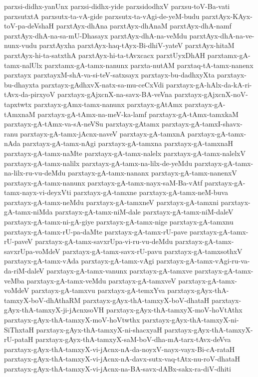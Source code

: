 {parxsi-didhx-yanUnx
parxsi-didhx-yide
parxsidodhxV
parxsu-toV-Ba-vati
parxsutxtA
parxsutx-ta-vA-gide
parxsutx-ta-vAgi-de-yeM-budu
parxtAyx-KAyx-toV-pa-deVshaH
parxtAyx-dhAna
parxtAyx-dhAnaM
parxtAyx-dhA-namf
parxtAyx-dhA-na-sa-mU-Dhasayx
parxtAyx-dhA-na-veMdu
parxtAyx-dhA-na-ve-nunx-vudu
parxtAyxha
parxtAyx-haq-tAyx-Bi-dhiV-yateV
parxtAyx-hitaM
parxtAyx-hi-ta-satxthA
parxtAyx-hi-ta-tAvxcacx
parxtUyxDhAH
parxtamx-gA-tamx-nalUlx
parxtamx-gA-tamx-nanunx
parxta-nutAM
parxtaq-tA-tamx-nanenx
parxtayx
parxtayxM-shA-va-si-teV-satxsayx
parxtayx-bu-dadhxyXta
parxtayx-bu-dhayxta
parxtayx-gAdhxvX-natx-sa-mu-ceCxVdi
parxtayx-gA-hAlx-da-kA-ri-tAvx-da-pirxyoV
parxtayx-gAjxcnX-na-savx-BA-veVna
parxtayx-gAjxcnX-noV-tapxtwtx
parxtayx-gAmx-tamx-nanunx
parxtayx-gAtAmx
parxtayx-gA-tAmxnaM
parxtayx-gA-tAmx-na-meV-ka-lamf
parxtayx-gA-tAmx-tamxkaM
parxtayx-gA-tAmx-va-sA-neVSu
parxtayx-gAtamx
parxtayx-gA-tamxI-shavx-ranu
parxtayx-gA-tamx-jAcnx-naveV
parxtayx-gA-tamxnA
parxtayx-gA-tamx-nAda
parxtayx-gA-tamx-nAgi
parxtayx-gA-tamxna
parxtayx-gA-tamxnaH
parxtayx-gA-tamx-naMte
parxtayx-gA-tamx-nalelx
parxtayx-gA-tamx-nalelxV
parxtayx-gA-tamx-nalilx
parxtayx-gA-tamx-na-lilx-de-yeMdu
parxtayx-gA-tamx-na-lilx-ru-vu-deMdu
parxtayx-gA-tamx-nananx
parxtayx-gA-tamx-nanenxV
parxtayx-gA-tamx-nanunx
parxtayx-gA-tamx-nayx-saM-Ba-vAtf
parxtayx-gA-tamx-nayx-vi-deyxVti
parxtayx-gA-tamxne
parxtayx-gA-tamx-neM-buva
parxtayx-gA-tamx-neMdu
parxtayx-gA-tamxneV
parxtayx-gA-tamxni
parxtayx-gA-tamx-niMda
parxtayx-gA-tamx-niM-dale
parxtayx-gA-tamx-niM-daleV
parxtayx-gA-tamx-ni-gA-giye
parxtayx-gA-tamx-nige
parxtayx-gA-tamxnu
parxtayx-gA-tamx-rU-pa-daMte
parxtayx-gA-tamx-rU-pave
parxtayx-gA-tamx-rU-paveV
parxtayx-gA-tamx-savxrUpa-vi-ru-vu-deMdu
parxtayx-gA-tamx-savxrUpa-voMdeV
parxtayx-gA-tamx-savx-rU-pavu
parxtayx-gA-tamxsothxV
parxtayx-gA-tamx-vAda
parxtayx-gA-tamx-vAgi
parxtayx-gA-tamx-vAgi-ru-va-da-riM-daleV
parxtayx-gA-tamx-vanunx
parxtayx-gA-tamxve
parxtayx-gA-tamx-veMba
parxtayx-gA-tamx-veMdu
parxtayx-gA-tamxveV
parxtayx-gA-tamx-voMdeV
parxtayx-gA-tamxvu
parxtayx-gA-temxYva
parxtayx-gAyx-thA-tamxyX-boV-dhAthaRM
parxtayx-gAyx-thA-tamxyX-boV-dhataH
parxtayx-gAyx-thA-tamxyX-ji-jAcnxsoVH
parxtayx-gAyx-thA-tamxyX-moV-hoVtAthx
parxtayx-gAyx-thA-tamxyX-moV-hoVtwthx
parxtayx-gAyx-thA-tamxyX-ni-SiThxtaH
parxtayx-gAyx-thA-tamxyX-ni-shacxyaH
parxtayx-gAyx-thA-tamxyX-rU-pataH
parxtayx-gAyx-thA-tamxyX-saM-boV-dha-mA-tarx-tAvx-deVva
parxtayx-gAyx-thA-tamxyX-vi-jAcnx-nA-da-noyxV-nayx-vayx-Bi-cA-rataH
parxtayx-gAyx-thA-tamxyX-vi-jAcnx-nA-davx-sutx-vaq-tAtx-nu-roV-dhataH
parxtayx-gAyx-thA-tamxyX-vi-jAcnx-na-BA-savx-dABx-sakx-ra-diV-dhiti
}
